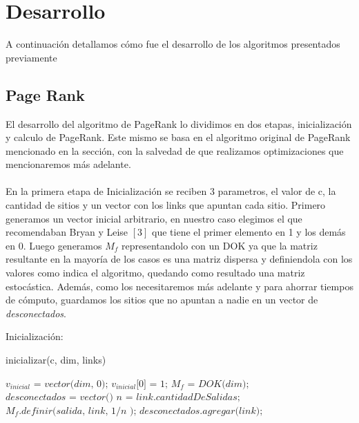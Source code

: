 \section{Desarrollo}

A continuación detallamos cómo fue el desarrollo de los algoritmos presentados previamente

\subsection{Page Rank}
El desarrollo del algoritmo de PageRank lo dividimos en dos etapas, inicializaci\'on  y calculo de PageRank. Este mismo se basa en el algoritmo original de PageRank mencionado en la sección, con la salvedad de que realizamos optimizaciones que mencionaremos más adelante.\\
\\
En la primera etapa de Inicialización se reciben 3 parametros, el valor de c, la cantidad de sitios y un vector con los links que apuntan cada sitio. Primero generamos un vector inicial arbitrario, en nuestro caso elegimos el que recomendaban Bryan y Leise $[3]$ que tiene el primer elemento en 1 y los demás en 0. Luego generamos $M_f$ representandolo con un DOK ya que la matriz resultante en la mayoría de los casos es una matriz dispersa y definiendola con los valores como indica el algoritmo, quedando como resultado una matriz estocástica. Además, como los necesitaremos más adelante y para ahorrar tiempos de cómputo, guardamos los sitios que no apuntan a nadie en un vector de \textit{desconectados}.

Inicializaci\'on:
\begin{algorithm}
\caption{inicializar(c, dim, links)}\label{euclid}
\begin{algorithmic}[1]
\State $\textit{$v_{inicial}$ = vector(dim, 0);}$ 
\State $\textit{$v_{inicial}$[0] = 1;}$ 
\State $\textit{$M_f$ = DOK(dim);}$ 
\State $\textit{desconectados = vector()}$ 
		\State $\textit{n = link.cantidadDeSalidas;}$
			\State $\textit{$M_f$.definir(salida, link, 1/n );}$ 
		\EndFor
		\Else
			\State $\textit{desconectados.agregar(link);}$ 
	\EndIf
\EndFor
\end{algorithmic}
\end{algorithm}

